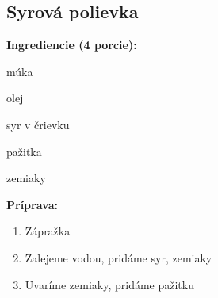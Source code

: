 \setcounter{step}{0}

\subsection{ Syrová polievka }

\begin{ingredient}
  
  \def\portions{  }
  \textbf{ {\normalsize Ingrediencie (4 porcie):} }

  \begin{main}
      \item múka
      \item olej
      \item syr v črievku
      \item pažitka
      \item zemiaky
  \end{main}
  
\end{ingredient}
\begin{recipe}
\textbf{ {\normalsize Príprava:} }
\begin{enumerate}

  \item{Zápražka}
  \item{Zalejeme vodou, pridáme syr, zemiaky}
  \item{Uvaríme zemiaky, pridáme pažitku}

\end{enumerate}
\end{recipe}

\begin{notes}
  
\end{notes}	
\clearpage
